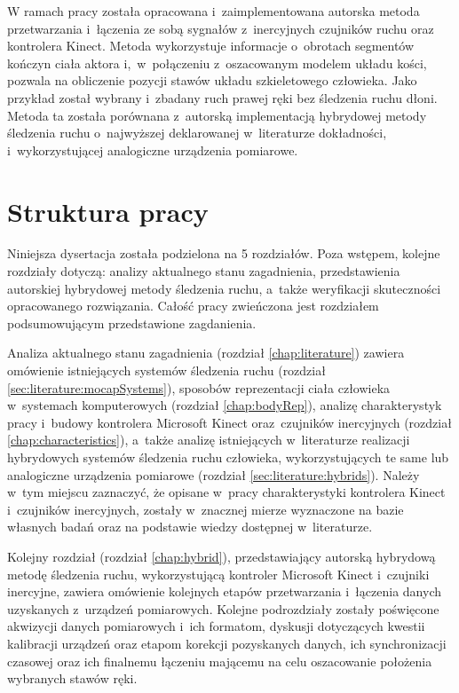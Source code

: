W ramach pracy została opracowana i~zaimplementowana autorska metoda przetwarzania i~łączenia ze sobą sygnałów z~inercyjnych czujników ruchu oraz kontrolera Kinect. Metoda wykorzystuje informacje o~obrotach segmentów kończyn ciała aktora i,~w~połączeniu z~oszacowanym modelem układu kości, pozwala na obliczenie pozycji stawów układu szkieletowego człowieka. 
Jako przykład został wybrany i~zbadany ruch prawej ręki bez śledzenia ruchu dłoni. Metoda ta została porównana z~autorską implementacją hybrydowej metody śledzenia ruchu o~najwyższej deklarowanej w~literaturze dokładności, i~wykorzystującej analogiczne urządzenia pomiarowe.\\

\section{Struktura pracy}
Niniejsza dysertacja została podzielona na 5 rozdziałów. Poza wstępem, kolejne rozdziały dotyczą: analizy aktualnego stanu zagadnienia, przedstawienia autorskiej hybrydowej metody śledzenia ruchu, a~także weryfikacji skuteczności opracowanego rozwiązania. Całość pracy zwieńczona jest rozdziałem podsumowującym przedstawione zagdanienia. 

Analiza aktualnego stanu zagadnienia (rozdział \ref{chap:literature}) zawiera omówienie istniejących systemów śledzenia ruchu (rozdział \ref{sec:literature:mocapSystems}), sposobów reprezentacji ciała człowieka w~systemach komputerowych (rozdział \ref{chap:bodyRep}), analizę charakterystyk pracy i~budowy kontrolera Microsoft Kinect oraz~czujników inercyjnych (rozdział \ref{chap:characteristics}), a~także analizę istniejących w~literaturze realizacji hybrydowych systemów śledzenia ruchu człowieka, wykorzystujących te same lub analogiczne urządzenia pomiarowe (rozdział \ref{sec:literature:hybrids}). Należy w~tym miejscu zaznaczyć, że opisane w~pracy charakterystyki kontrolera Kinect i~czujników inercyjnych, zostały w~znacznej mierze wyznaczone na bazie własnych badań oraz na podstawie wiedzy dostępnej w~literaturze.

Kolejny rozdział (rozdział \ref{chap:hybrid}), przedstawiający autorską hybrydową metodę śledzenia ruchu, wykorzystującą kontroler Microsoft Kinect i~czujniki inercyjne, zawiera omówienie kolejnych etapów przetwarzania i~łączenia danych uzyskanych z~urządzeń pomiarowych. Kolejne podrozdziały zostały poświęcone akwizycji danych pomiarowych i~ich formatom, dyskusji dotyczących kwestii kalibracji urządzeń oraz etapom korekcji pozyskanych danych, ich synchronizacji czasowej oraz ich finalnemu łączeniu mającemu na celu oszacowanie położenia wybranych stawów ręki. 

